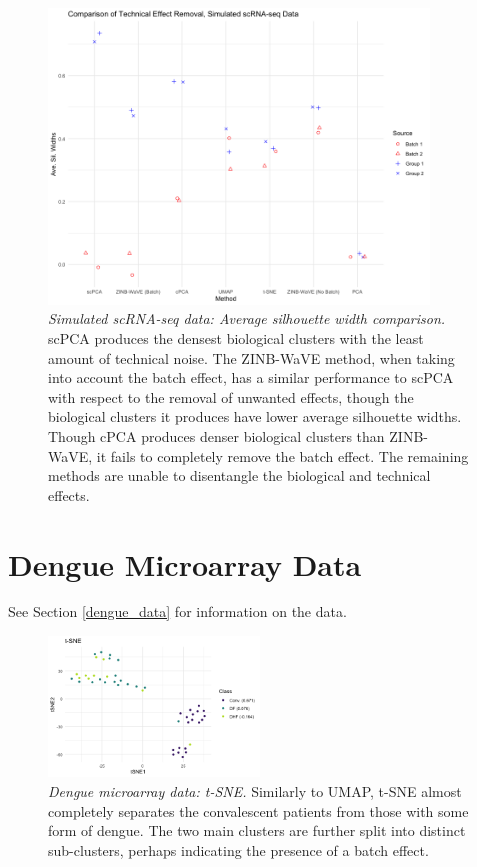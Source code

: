 \begin{figure}[!htbp]
    \centering
    \includegraphics[width=0.9\textwidth]{figures/technical_effect_removal_sim.png}
    \caption{{\em Simulated scRNA-seq data: Average silhouette width comparison.}
    scPCA produces the densest biological clusters with the least amount of technical noise. The ZINB-WaVE method, when taking into account the batch effect, has a similar performance to scPCA with respect to the removal of unwanted effects, though the biological clusters it produces have lower average silhouette widths. Though cPCA produces denser biological clusters than ZINB-WaVE, it fails to completely remove the batch effect. The remaining methods are unable to disentangle the biological and technical effects. 
    }
    \label{fig:ave_sil_widths}
\end{figure}

\FloatBarrier

\section{Dengue Microarray Data}\label{sup_dengue}

See Section \ref{dengue_data} for information on the data.

\begin{figure}[!htbp]
    \centering
    \includegraphics[width=0.5\textwidth]{figures/dengue_tsne.png}
    \caption{
    {\em Dengue microarray data: t-SNE.}
    Similarly to UMAP, t-SNE almost completely separates the convalescent patients from those with some form of dengue. The two main clusters are further split into distinct sub-clusters, perhaps indicating the presence of a batch effect. 
    }
    \label{fig:dengue_tsne}
\end{figure}

